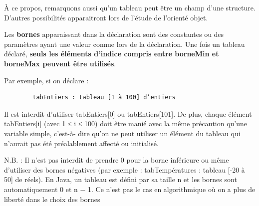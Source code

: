 \documentclass[11pt,a4paper]{article}
\begin{document}
            \par
        
        \`A ce propos, remarquons aussi qu'un tableau peut \^etre un
        champ d'une structure. D'autres possibilit\'es apparaitront lors de l'\'etude de l'orient\'e objet.
      
            \par
        
        Les \textbf{bornes} apparaissant dans la d\'eclaration 
        sont des constantes ou des param\`etres ayant une
        valeur connue lors de la d\'eclaration. Une fois un tableau d\'eclar\'e, \textbf{seuls les \'el\'ements d'indice
        compris entre borneMin et borneMax peuvent \^etre utilis\'es}. 
      
            \par
        
        Par exemple, si on d\'eclare :
      
            \par
        \begin{verbatim}
        tabEntiers : tableau [1 à 100] d’entiers
      \end{verbatim}
        Il est interdit d'utiliser tabEntiers[0] ou tabEntiers[101]. De plus, chaque \'el\'ement tabEntiers[i]
        (avec 1 ≤ i ≤ 100) doit \^etre mani\'e avec la m\^eme pr\'ecaution qu'une variable simple, c'est-\`a-
        dire qu'on ne peut utiliser un \'el\'ement du tableau qui n'aurait pas \'et\'e pr\'ealablement affect\'e
        ou initialis\'e.
      
            \par
        
        N.B. : Il n'est pas interdit de prendre 0 pour la borne inf\'erieure ou m\^eme d'utiliser des
        bornes n\'egatives (par exemple : tabTemp\'eratures : tableau [-20 \`a 50] de r\'eels).
        En Java, un tableau est d\'efini par sa taille n et les bornes sont automatiquement 0 et n − 1.
        Ce n'est pas le cas en algorithmique o\`u on a plus de libert\'e dans le choix des bornes
      
\end{document}
